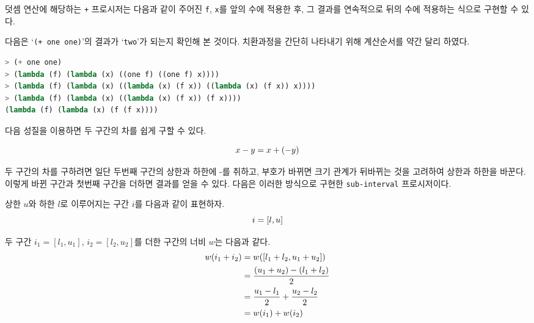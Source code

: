 덧셈 연산에 해당하는 \texttt{+} 프로시저는 다음과 같이 주어진
\texttt{f}, \texttt{x}를 앞의 수에 적용한 후, 그 결과를 연속적으로 뒤의 수에
적용하는 식으로 구현할 수 있다.


다음은 `\texttt{(+ one one)}'의 결과가 `\texttt{two}'가 되는지 확인해 본
것이다. 치환과정을 간단히 나타내기 위해 계산순서를 약간 달리 하였다.

\begin{lstlisting}[language=Scheme]
> (+ one one)
> (lambda (f) (lambda (x) ((one f) ((one f) x))))
> (lambda (f) (lambda (x) ((lambda (x) (f x)) ((lambda (x) (f x)) x))))
> (lambda (f) (lambda (x) ((lambda (x) (f x)) (f x))))
(lambda (f) (lambda (x) (f (f x))))
\end{lstlisting}




다음 성질을 이용하면 두 구간의 차를 쉽게 구할 수 있다.

\begin{equation}\notag
  x-y=x+(-y)
\end{equation}

두 구간의 차를 구하려면 일단 두번째 구간의 상한과 하한에 -를 취하고, 부호가
바뀌면 크기 관계가 뒤바뀌는 것을 고려하여 상한과 하한을 바꾼다. 이렇게 바뀐
구간과 첫번째 구간을 더하면 결과를 얻을 수 있다. 다음은 이러한 방식으로 구현한
\texttt{sub-interval} 프로시저이다.



상한 $u$와 하한 $l$로 이루어지는 구간 $i$를 다음과 같이 표현하자.
\begin{equation}\notag
  i = [l, u]
\end{equation}

두 구간 $i_1=[l_1,u_1]$, $i_2=[l_2,u_2]$를 더한 구간의 너비 $w$는 다음과 같다.
\begin{align}
  w(i_1 + i_2) & = w([l_1+l_2,u_1+u_2])
  \notag\\
  & = \frac{(u_1+u_2)-(l_1+l_2)}{2}
  \notag\\
  & = \frac{u_1-l_1}{2} + \frac{u_2-l_2}{2}
  \notag\\
  & = w(i_1) + w(i_2)
  \notag
\end{align}

